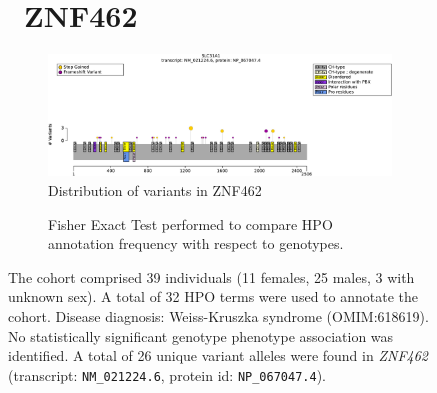 \begin{figure}[htbp]
\section*{ ZNF462}
\centering
\begin{subfigure}[b]{0.95\textwidth}
\centering
\includegraphics[width=\textwidth]{ img/ZNF462_protein_diagram.pdf} 
\captionsetup{justification=raggedright,singlelinecheck=false}
\caption{Distribution of variants in ZNF462}
\end{subfigure}

\vspace{2em}

\begin{subfigure}[b]{0.95\textwidth}
\centering
{}
\captionsetup{justification=raggedright,singlelinecheck=false}
\caption{Fisher Exact Test performed to compare HPO annotation frequency with respect to genotypes. }
\end{subfigure}

\vspace{2em}

\caption{ The cohort comprised 39 individuals (11 females, 25 males, 3 with unknown sex). 
A total of 32 HPO terms were used to annotate the cohort. Disease diagnosis: Weiss-Kruszka syndrome (OMIM:618619). 
No statistically significant genotype phenotype association was identified. 
A total of 26 unique variant alleles were found in \textit{ZNF462} (transcript: \texttt{NM\_021224.6}, protein id: \texttt{NP\_067047.4}).}
\end{figure}
